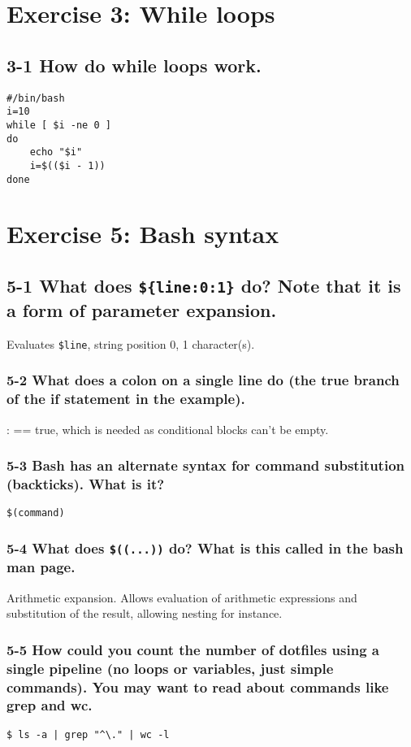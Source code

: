 \section{Exercise 3: While loops}
\subsection{3-1 How do while loops work.}
\begin{verbatim}
#/bin/bash
i=10
while [ $i -ne 0 ]
do
    echo "$i"
    i=$(($i - 1))
done
\end{verbatim}

\section{Exercise 5: Bash syntax}
\subsection{5-1 What does \texttt{\$\{line:0:1\}} do? Note that it is a form of parameter expansion.}
Evaluates \verb=$line=, string position 0, 1 character(s).

\subsubsection{5-2 What does a colon on a single line do (the true branch of the if statement in the example).}
: == true, which is needed as conditional blocks can't be empty.

\subsubsection{5-3 Bash has an alternate syntax for command substitution (backticks). What is it?}
\verb=$(command)=

\subsubsection{5-4 What does \texttt{\$((...))} do? What is this called in the bash man page.}
Arithmetic expansion. Allows evaluation of arithmetic expressions and substitution of the result, allowing nesting for instance.

\subsubsection{5-5 How could you count the number of dotfiles using a single pipeline (no loops or variables, just simple commands). You may want to read about commands like grep and wc.}
\verb=$ ls -a | grep "^\." | wc -l=

